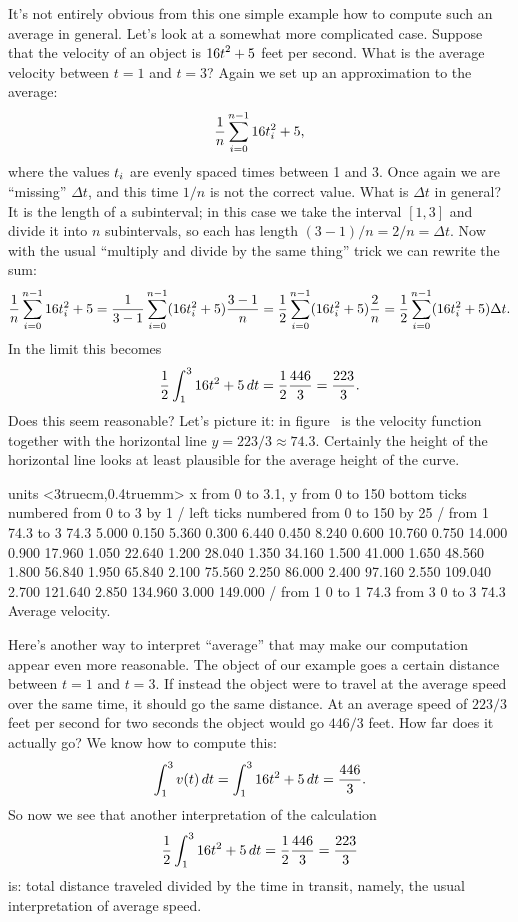 It's not entirely obvious from this one simple example how to compute
such an average in general. Let's look at a somewhat more complicated
case. Suppose that the velocity of an object is $\displaystyle 16
t^2+5$ feet per second. 
What is the average velocity between $t=1$ and $t=3$? Again we
set up an approximation to the average:
$${1\over n}\sum_{i=0}^{n-1} 16t_i^2+5,$$
where the values $\displaystyle t_i$ are evenly spaced 
times between 1 and 3. Once again we are ``missing'' $\Delta t$, and
this time $1/n$ is not the correct value. What is $\Delta t$ in
general? It is the length of a subinterval; in this case we take the
interval $[1,3]$ and divide it into $n$ subintervals, so each
has length $(3-1)/n=2/n=\Delta t$. Now with the usual ``multiply and
divide by the same thing'' trick we can rewrite the sum:
$$
  {1\over n}\sum_{i=0}^{n-1} 16t_i^2+5=
  {1\over 3-1}\sum_{i=0}^{n-1} (16t_i^2+5){3-1\over n}=
  {1\over 2}\sum_{i=0}^{n-1} (16t_i^2+5){2\over n}=
  {1\over 2}\sum_{i=0}^{n-1} (16t_i^2+5)\Delta t.
$$
In the limit this becomes
$${1\over 2}\int_1^3 16t^2+5\,dt={1\over 2}{446\over 3}={223\over 3}.$$
Does this seem reasonable? Let's picture it: in
figure~ is the velocity function together
with the horizontal line $y=223/3\approx 74.3$. Certainly 
the height of the
horizontal line looks at least plausible for the average height of the
curve.

\figure
\texonly
\vbox{\beginpicture
\normalgraphs
\ninepoint
\setcoordinatesystem units <3truecm,0.4truemm>
\setplotarea x from 0 to 3.1, y from 0 to 150
\axis bottom ticks numbered from 0 to 3 by 1 /
\axis left ticks numbered from 0 to 150 by 25 /
\putrule from 1 74.3 to 3 74.3
\setquadratic
{} 5.000 0.150 5.360 0.300 6.440 0.450 8.240 0.600 10.760 
0.750 14.000 0.900 17.960 1.050 22.640 1.200 28.040 1.350 34.160 
1.500 41.000 1.650 48.560 1.800 56.840 1.950 65.840 2.100 75.560 
2.250 86.000 2.400 97.160 2.550 109.040 2.700 121.640 2.850 134.960 
3.000 149.000 /
\setdashes
\putrule from 1 0 to 1 74.3
\putrule from 3 0 to 3 74.3
\endpicture}
\endtexonly
{}
\begincaption
Average velocity.
\endcaption
\endfigure

Here's another way to interpret ``average'' that may make our
computation appear even more reasonable. The object of our example
goes a certain distance between $t=1$ and $t=3$. If instead the object
were to travel at the average speed over the same time, it should go
the same distance. At an average speed of $223/3$ feet per second for
two seconds the object would go $446/3$ feet. How far does it actually
go? We know how to compute this:
$$\int_1^3 v(t)\,dt = \int_1^3 16t^2+5\,dt={446\over 3}.$$
So now we see that another interpretation of the calculation
$${1\over 2}\int_1^3 16t^2+5\,dt={1\over 2}{446\over 3}={223\over 3}$$
is: total distance traveled divided by the time in transit, namely,
the usual interpretation of average speed.

